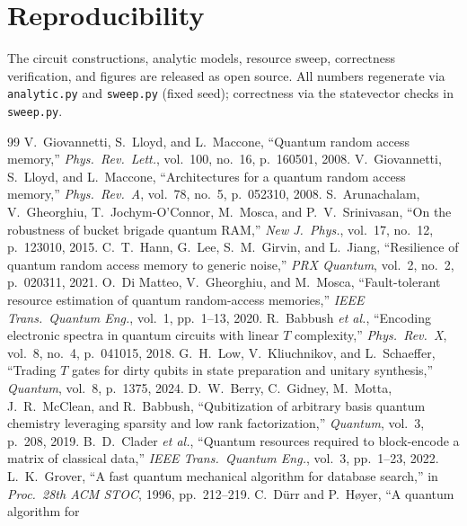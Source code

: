 \documentclass[11pt]{article}
\theoremstyle{definition}
\begin{document}
\section*{Reproducibility}
The circuit constructions, analytic models, resource sweep, correctness
verification, and figures are released as open source. All numbers regenerate via
\texttt{analytic.py} and \texttt{sweep.py} (fixed seed); correctness via the
statevector checks in \texttt{sweep.py}.

\begin{thebibliography}{99}
 V.~Giovannetti, S.~Lloyd, and L.~Maccone, ``Quantum
  random access memory,'' \emph{Phys.\ Rev.\ Lett.}, vol.~100, no.~16, p.~160501, 2008.
 V.~Giovannetti, S.~Lloyd, and L.~Maccone,
  ``Architectures for a quantum random access memory,'' \emph{Phys.\ Rev.\ A},
  vol.~78, no.~5, p.~052310, 2008.
 S.~Arunachalam, V.~Gheorghiu,
  T.~Jochym-O'Connor, M.~Mosca, and P.~V.~Srinivasan, ``On the robustness of
  bucket brigade quantum RAM,'' \emph{New J.\ Phys.}, vol.~17, no.~12, p.~123010, 2015.
 C.~T.~Hann, G.~Lee, S.~M.~Girvin, and L.~Jiang,
  ``Resilience of quantum random access memory to generic noise,'' \emph{PRX
  Quantum}, vol.~2, no.~2, p.~020311, 2021.
 O.~Di Matteo, V.~Gheorghiu, and M.~Mosca,
  ``Fault-tolerant resource estimation of quantum random-access memories,''
  \emph{IEEE Trans.\ Quantum Eng.}, vol.~1, pp.~1--13, 2020.
 R.~Babbush \emph{et al.}, ``Encoding electronic
  spectra in quantum circuits with linear $T$ complexity,'' \emph{Phys.\ Rev.\ X},
  vol.~8, no.~4, p.~041015, 2018.
 G.~H.~Low, V.~Kliuchnikov, and L.~Schaeffer, ``Trading
  $T$ gates for dirty qubits in state preparation and unitary synthesis,''
  \emph{Quantum}, vol.~8, p.~1375, 2024.
 D.~W.~Berry, C.~Gidney, M.~Motta, J.~R.~McClean,
  and R.~Babbush, ``Qubitization of arbitrary basis quantum chemistry leveraging
  sparsity and low rank factorization,'' \emph{Quantum}, vol.~3, p.~208, 2019.
 B.~D.~Clader \emph{et al.}, ``Quantum resources
  required to block-encode a matrix of classical data,'' \emph{IEEE Trans.\
  Quantum Eng.}, vol.~3, pp.~1--23, 2022.
 L.~K.~Grover, ``A fast quantum mechanical algorithm for
  database search,'' in \emph{Proc.\ 28th ACM STOC}, 1996, pp.~212--219.
\bibitem{durr1996minimum} C.~D{\"u}rr and P.~H{\o}yer, ``A quantum algorithm for

\end{thebibliography}
\end{document}
